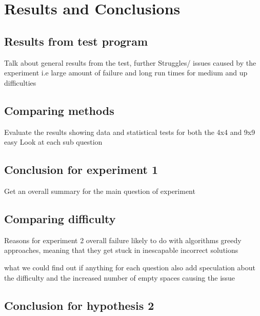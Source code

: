 \documentclass[a4paper,11pt]{article}
\begin{document}
\section{Results and Conclusions}
\subsection{Results from test program}
Talk about general results from the test, further 
Struggles/ issues caused by the experiment i.e large amount of failure and long run times for medium and up difficulties

\subsection{Comparing methods}
Evaluate the results showing data and statistical tests for both the 4x4 and 9x9 easy
Look at each sub question
\subsection{Conclusion for experiment 1}
Get an overall summary for the main question of experiment
\subsection{Comparing difficulty}
Reasons for experiment 2 overall failure
likely to do with algorithms greedy approaches, meaning that they get stuck in inescapable incorrect solutions

what we could find out if anything for each question
also add speculation about the difficulty and the increased number of empty spaces causing the issue

\subsection{Conclusion for hypothesis 2}
\end{document}
